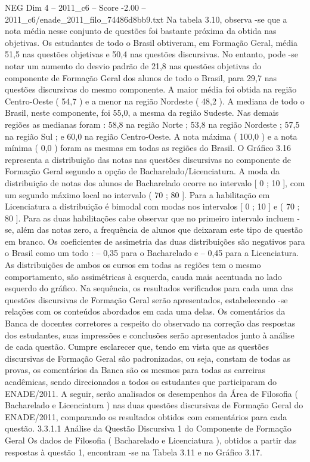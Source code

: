\begin{textsample}{NEG Dim 4 – 2011\_c6 – Score -2.00 – 2011\_c6/enade\_2011\_filo\_74486d8bb9.txt}
Na tabela 3.10, observa -se que a nota média nesse conjunto de questões foi bastante próxima da obtida nas objetivas.
Os estudantes de todo o Brasil obtiveram, em Formação Geral, média 51,5 nas questões objetivas e 50,4 nas questões discursivas.
No entanto, pode -se notar um aumento do desvio padrão de 21,8 nas questões objetivas do componente de Formação Geral dos alunos de todo o Brasil, para 29,7 nas questões discursivas do mesmo componente.
A maior média foi obtida na região Centro-Oeste ( 54,7 ) e a menor na região Nordeste ( 48,2 ).
A mediana de todo o Brasil, neste componente, foi 55,0, a mesma da região Sudeste.
Nas demais regiões as medianas foram : 58,8 na região Norte ; 53,8 na região Nordeste ; 57,5 na região Sul ; e 60,0 na região Centro-Oeste.
A nota máxima ( 100,0 ) e a nota mínima ( 0,0 ) foram as mesmas em todas as regiões do Brasil.
O Gráfico 3.16 representa a distribuição das notas nas questões discursivas no componente de Formação Geral segundo a opção de Bacharelado/Licenciatura.
A moda da distribuição de notas dos alunos de Bacharelado ocorre no intervalo [ 0 ; 10 ], com um segundo máximo local no intervalo ( 70 ; 80 ].
Para a habilitação em Licenciatura a distribuição é bimodal com modas nos intervalos [ 0 ; 10 ] e ( 70 ; 80 ].
Para as duas habilitações cabe observar que no primeiro intervalo incluem -se, além das notas zero, a frequência de alunos que deixaram este tipo de questão em branco.
Os coeficientes de assimetria das duas distribuições são negativos para o Brasil como um todo : – 0,35 para o Bacharelado e – 0,45 para a Licenciatura.
As distribuições de ambos os cursos em todas as regiões tem o mesmo comportamento, são assimétricas à esquerda, cauda mais acentuada no lado esquerdo do gráfico.
Na sequência, os resultados verificados para cada uma das questões discursivas de Formação Geral serão apresentados, estabelecendo -se relações com os conteúdos abordados em cada uma delas.
Os comentários da Banca de docentes corretores a respeito do observado na correção das respostas dos estudantes, suas impressões e conclusões serão apresentados junto à análise de cada questão.
Cumpre esclarecer que, tendo em vista que as questões discursivas de Formação Geral são padronizadas, ou seja, constam de todas as provas, os comentários da Banca são os mesmos para todas as carreiras acadêmicas, sendo direcionados a todos os estudantes que participaram do ENADE/2011.
A seguir, serão analisados os desempenhos da Área de Filosofia ( Bacharelado e Licenciatura ) nas duas questões discursivas de Formação Geral do ENADE/2011, comparando os resultados obtidos com comentários para cada questão. 3.3.1.1 Análise da Questão Discursiva 1 do Componente de Formação Geral Os dados de Filosofia ( Bacharelado e Licenciatura ), obtidos a partir das respostas à questão 1, encontram -se na Tabela 3.11 e no Gráfico 3.17.

\end{textsample}
